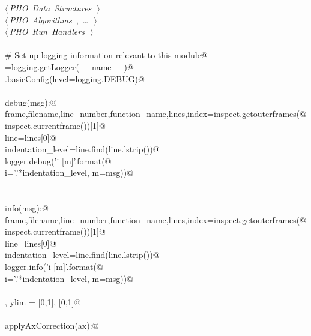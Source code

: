 \documentclass[10.0pt]{report}
\begin{document}
\begin{appendices}
\begin{flushleft}
\begin{list}{}{}
\mbox{}\verb@@\hbox{$\langle\,${\itshape PHO Data Structures}\nobreak\ {\footnotesize {}}$\,\rangle$}\verb@@\\
\mbox{}\verb@@\hbox{$\langle\,${\itshape PHO Algorithms}\nobreak\ {\footnotesize {}, \ldots\ }$\,\rangle$}\verb@@\\
\mbox{}\verb@@\hbox{$\langle\,${\itshape PHO Run Handlers}\nobreak\ {\footnotesize {}}$\,\rangle$}\verb@@\\
\mbox{}\verb@@\\
\mbox{}\verb@# Set up logging information relevant to this module@\\
\mbox{}\verb@logger=logging.getLogger(__name__)@\\
\mbox{}\verb@logging.basicConfig(level=logging.DEBUG)@\\
\mbox{}\verb@@\\
\mbox{}\verb@def debug(msg):@\\
\mbox{}\verb@    frame,filename,line_number,function_name,lines,index=inspect.getouterframes(@\\
\mbox{}\verb@        inspect.currentframe())[1]@\\
\mbox{}\verb@    line=lines[0]@\\
\mbox{}\verb@    indentation_level=line.find(line.lstrip())@\\
\mbox{}\verb@    logger.debug('{i} [{m}]'.format(@\\
\mbox{}\verb@        i='.'*indentation_level, m=msg))@\\
\mbox{}\verb@@\\
\mbox{}\verb@@\\
\mbox{}\verb@def info(msg):@\\
\mbox{}\verb@    frame,filename,line_number,function_name,lines,index=inspect.getouterframes(@\\
\mbox{}\verb@        inspect.currentframe())[1]@\\
\mbox{}\verb@    line=lines[0]@\\
\mbox{}\verb@    indentation_level=line.find(line.lstrip())@\\
\mbox{}\verb@    logger.info('{i} [{m}]'.format(@\\
\mbox{}\verb@        i='.'*indentation_level, m=msg))@\\
\mbox{}\verb@@\\
\mbox{}\verb@xlim, ylim = [0,1], [0,1]@\\
\mbox{}\verb@@\\
\mbox{}\verb@def applyAxCorrection(ax):@\\

\end{list}
\end{flushleft}
\end{appendices}
\end{document}
